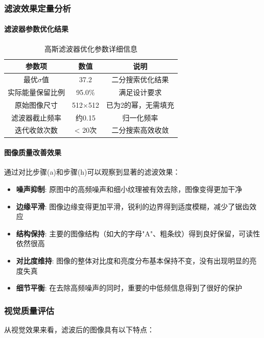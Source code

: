 \documentclass[a4paper]{article}
\begin{document}
\subsubsection{滤波效果定量分析}

\paragraph{滤波器参数优化结果}
\begin{table}[H]
\centering
\begin{tabular}{|c|c|c|}
\hline
参数项 & 数值 & 说明 \\
\hline
最优$\sigma$值 & 37.2 & 二分搜索优化结果 \\
实际能量保留比例 & 95.0\% & 满足设计要求 \\
原始图像尺寸 & 512×512 & 已为2的幂，无需填充 \\
滤波器截止频率 & 约0.15 & 归一化频率 \\
迭代收敛次数 & < 20次 & 二分搜索高效收敛 \\
\hline
\end{tabular}
\caption{高斯滤波器优化参数详细信息}
\end{table}

\paragraph{图像质量改善效果}
通过对比步骤(a)和步骤(h)可以观察到显著的滤波效果：

\begin{itemize}
    \item \textbf{噪声抑制}: 原图中的高频噪声和细小纹理被有效去除，图像变得更加干净
    \item \textbf{边缘平滑}: 图像边缘变得更加平滑，锐利的边界得到适度模糊，减少了锯齿效应
    \item \textbf{结构保持}: 主要的图像结构（如大的字母"A"、粗条纹）得到良好保留，可读性依然很高
    \item \textbf{对比度维持}: 图像的整体对比度和亮度分布基本保持不变，没有出现明显的亮度失真
    \item \textbf{细节平衡}: 在去除高频噪声的同时，重要的中低频信息得到了很好的保护
\end{itemize}

\subsubsection{视觉质量评估}

从视觉效果来看，滤波后的图像具有以下特点：
\end{document}
